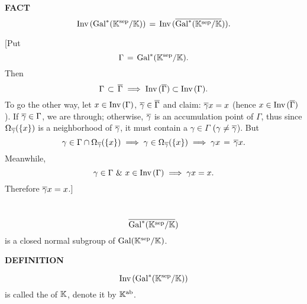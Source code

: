 \vspace{0.1cm}


\begin{x}{\small\bf FACT} \ %
\[
\text{Inv}\hspace{0.05cm}(\text{Gal}^*(\mathbb{K}^{\text{sep}}/\mathbb{K})) \hspace{0.05cm} = \hspace{0.05cm} \text{Inv}\hspace{0.05cm}(\overline{\text{Gal}^*(\mathbb{K}^{\text{sep}}/\mathbb{K}})).
\]

\vspace{0.1cm}

[Put
\[
\Gamma \hspace{0.05cm} = \hspace{0.05cm} \text{Gal}^*(\mathbb{K}^{\text{sep}}/\mathbb{K}).
\]
Then
\[
\Gamma \hspace{0.05cm}\subset\hspace{0.05cm} \overline{\Gamma} \implies \text{Inv}\hspace{0.05cm}(\overline{\Gamma}) \subset \text{Inv}\hspace{0.05cm}(\Gamma).
\]
To go the other way, let $x \in \text{Inv}\hspace{0.05cm}(\Gamma)$, $\overline{\gamma} \in \overline{\Gamma}$ and claim: 
$\overline{\gamma} x = x$ (hence $x \in \text{Inv}\hspace{0.05cm}(\overline{\Gamma})$).  
If $\overline{\gamma} \in \Gamma$, we are through; otherwise, 
$\overline{\gamma}$ is an accumulation point of $\Gamma$, thus since 
$\Omega_{\overline{\gamma}} (\{x\})$ is a neighborhood of $\overline{\gamma}$, it must contain a 
$\gamma \in \Gamma$ $(\gamma \neq \overline{\gamma}$).  
But
\[
\gamma \in \Gamma \cap \Omega_{\overline{\gamma}} (\{x\}) \implies 
\gamma \in  \Omega_{\overline{\gamma}} (\{x\}) \implies 
\gamma x \hspace{0.05cm} = \hspace{0.05cm} \overline{\gamma} x.
\]
Meanwhile, 
\[
\gamma \in \Gamma  \ \& \ x \in \text{Inv}\hspace{0.05cm}(\Gamma) \implies \gamma x = x.
\]
Therefore $\overline{\gamma} x = x$.]
\end{x}

\vspace{0.1cm}


\begin{x}{\small\bf {}} \ %
\[
\overline{\text{Gal}^*(\mathbb{K}^{\text{sep}}/\mathbb{K}})
\]
is a closed normal subgroup of $\text{Gal}(\mathbb{K}^{\text{sep}}/\mathbb{K})$.
\end{x}

\vspace{0.1cm}


\begin{x}{\small\bf DEFINITION} \ %

\[
\text{Inv}\hspace{0.05cm}(\text{Gal}^*(\mathbb{K}^{\text{sep}}/\mathbb{K}))
\]
is called the 
of $\mathbb{K}$, denote it by $\K^\ab$.
\index{$\K^\ab$}
\end{x}

\vspace{0.1cm}


